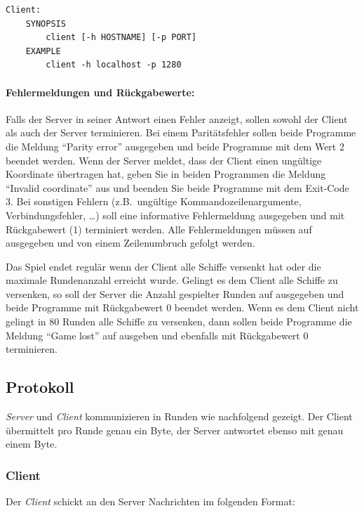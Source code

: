 \begin{verbatim}
Client:
    SYNOPSIS
        client [-h HOSTNAME] [-p PORT]
    EXAMPLE
        client -h localhost -p 1280
\end{verbatim}

\paragraph{Fehlermeldungen und Rückgabewerte:}

Falls der Server in seiner Antwort einen Fehler anzeigt, sollen sowohl der Client als auch der Server terminieren.
Bei einem Paritätsfehler sollen beide Programme die Meldung ``Parity error'' ausgegeben
und beide Programme mit dem Wert 2 beendet werden.
Wenn der Server meldet, dass der Client einen ungültige Koordinate übertragen hat,
geben Sie in beiden Programmen die Meldung ``Invalid coordinate'' aus und beenden Sie beide Programme mit dem Exit-Code 3.
Bei sonstigen Fehlern (z.B.\ ungültige Kommandozeilenargumente, Verbindungsfehler, \ldots)
soll eine informative Fehlermeldung ausgegeben und mit Rückgabewert
 (1) terminiert werden. Alle Fehlermeldungen müssen auf
 ausgegeben und von einem Zeilenumbruch gefolgt werden.

Das Spiel endet regulär wenn der Client alle Schiffe versenkt hat oder die maximale Rundenanzahl erreicht wurde.
Gelingt es dem Client alle Schiffe zu versenken, so soll der Server die Anzahl gespielter Runden auf  ausgegeben und beide
Programme mit Rückgabewert 0 beendet werden.
Wenn es dem Client nicht gelingt in 80 Runden alle Schiffe zu versenken, dann sollen beide Programme die Meldung ``Game lost'' auf  ausgeben
und ebenfalls mit Rückgabewert 0 terminieren.

\subsection*{Protokoll}
\label{sec:prot}
\emph{Server} und \emph{Client} kommunizieren in Runden wie nachfolgend
gezeigt. Der Client übermittelt pro Runde genau ein Byte,
der Server antwortet ebenso mit genau einem Byte.

\subsubsection*{Client}
Der \emph{Client} schickt an den Server Nachrichten im folgenden Format:

